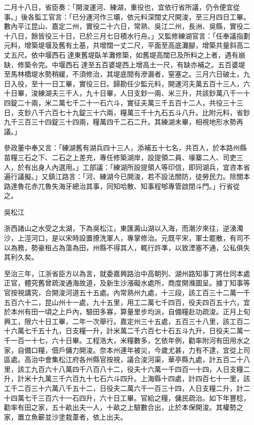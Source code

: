 \begin{pinyinscope}
 二月十八日，省臣奏：「開浚運河、練湖，重役也，宜依行省所議，仍令便宜從事。」後各監工官言：「已分運河作三壩，依元料深闊丈尺開浚，至三月四日工畢。數內平江昆山、嘉定二州，實役二十六日，常熟、吳江二州，長洲、吳縣，實役二十八日，餘皆役三十日，已於三月七日積水行舟。」又監修練湖官言：「任奉議指劃元料，增築堤堰及舊有土基，共增闊一丈二尺，平面至高底灘腳，增築共量斜高二丈五尺。依中堰西石達東舊堤臥羊灘修築，如舊堤高闊已及所料之上者，遇有崩缺，修築令完。中堰西石達至五百婆堤西上增高土一尺，有缺亦補之。五百婆堤至馬林橋堤水勢稍緩，不須修治，其堤底間有滲漏者，窒塞之。三月六日破土，九日入役，至十一日工畢，實役三日。歸勘任少監元料，開運河夫萬五百十三人，六十日畢，浚練湖夫三千人，九十日畢，人日支鈔一兩、米三升，共該鈔萬八千一十四錠二十兩，米二萬七千二十一石六斗，實征夫萬三千五百十二人，共役三十三日，支鈔八千六百七十九錠三十六兩，糧萬三千十九石五斗八升。比附元料，省鈔九千三百三十四錠三十四兩，糧萬四千二石二升。其練湖未畢，相視地形水勢再議。」



 參政董中奉又言：「練湖舊有湖兵四十三人，添補五十七名，共百人，於本路州縣苗糧三石之下、二石之上差充，專任修築湖岸，設提領二員、壕寨二人、司吏三人，於有出身人內選用。」工部議：「練湖所設提領人等印信，即同湖兵，宜咨本省遍行議擬。」又鎮江路言：「河、練湖今已開浚，若不設法關防，徒勞民力。除關本路達魯花赤兀魯失海牙總治其事，同知哈散、知事程郇專管啟閉斗門。」行省從之。



 吳松江



 浙西諸山之水受之太湖，下為吳松江，東匯澱山湖以入海，而潮汐來往，逆湧濁沙，上涇河口，是以宋時設置撩洗軍人，專掌修治。元既平宋，軍士罷散，有司不以為務，勢豪租占為蕩為田，州縣不得其人，輒行許準，以致湮塞不通，公私俱失其利久矣。



 至治三年，江浙省臣方以為言，就委嘉興路治中高朝列、湖州路知事丁將仕同本處正官，體究舊曾疏浚通海故道，及新生沙漲礙水處所，商度開滌圖呈。據丁知事等官按視講究，合開浚河道五十五處。內常熟州九處，十三段，該工百三十二萬一千五百六十二，昆山州十一處，九十五里，用工二萬七千四百，役夫四百五十六，宜於本州有田一頃之上戶內，驗田多寡，算量里步均派，自備糧赴功疏浚。正月上旬興工，限六十日工畢，二年一次舉行。嘉定州三十五處，五百三十八里，該工百二十六萬七千五十九，日支糧一升，計米萬二千六百七十石五斗九升，日役夫二萬一千一百一十七，六十日畢。工程浩大，米糧數多，乞依年例，勸率附河有田用水之家，自備口糧，佃戶傭力開浚。奈本州連年被災，今歲尤甚，力有不逮，宜從上司區處。高治中會集松江府各州縣官按視，議合浚河渠，華亭縣九處，計五百二十八里，該工九百六十八萬四千八百八十二，役夫十六萬一千四百一十四，人日支糧二升，計米十九萬三千六百九十七石六斗四升。上海縣十四處，計四百七十一里，該工千二百三十六萬八千五十二，日役夫二萬六千一百三十四，人日支糧二升，計二十四萬七千三百六十一石四升，六十日工畢。官給之糧，傭民疏治。如下年豐稔，勸率有田之家，五十畝出夫一人，十畝之上驗數合出，止於本保開浚。其權勢之家，置立魚籪並沙塗栽葦者，依上出夫。




\end{pinyinscope}
